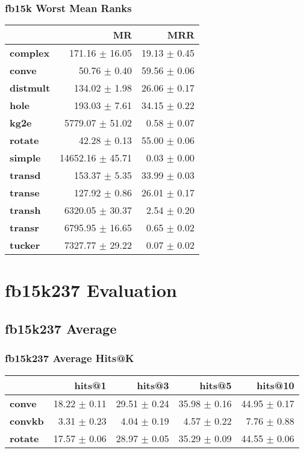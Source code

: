 \documentclass{article}
\begin{document}
\subsubsection{fb15k Worst Mean Ranks}
    \begin{center}
    \begin{tabular}{lrr}
\toprule
{} &                MR &           MRR \\
\midrule
\textbf{complex } &    171.16 $\pm$ 16.05 &  19.13 $\pm$ 0.45 \\
\textbf{conve   } &      50.76 $\pm$ 0.40 &  59.56 $\pm$ 0.06 \\
\textbf{distmult} &     134.02 $\pm$ 1.98 &  26.06 $\pm$ 0.17 \\
\textbf{hole    } &     193.03 $\pm$ 7.61 &  34.15 $\pm$ 0.22 \\
\textbf{kg2e    } &   5779.07 $\pm$ 51.02 &   0.58 $\pm$ 0.07 \\
\textbf{rotate  } &      42.28 $\pm$ 0.13 &  55.00 $\pm$ 0.06 \\
\textbf{simple  } &  14652.16 $\pm$ 45.71 &   0.03 $\pm$ 0.00 \\
\textbf{transd  } &     153.37 $\pm$ 5.35 &  33.99 $\pm$ 0.03 \\
\textbf{transe  } &     127.92 $\pm$ 0.86 &  26.01 $\pm$ 0.17 \\
\textbf{transh  } &   6320.05 $\pm$ 30.37 &   2.54 $\pm$ 0.20 \\
\textbf{transr  } &   6795.95 $\pm$ 16.65 &   0.65 $\pm$ 0.02 \\
\textbf{tucker  } &   7327.77 $\pm$ 29.22 &   0.07 $\pm$ 0.02 \\
\bottomrule
\end{tabular}

    \end{center}

\section{fb15k237 Evaluation}
\subsection{fb15k237 Average}
\subsubsection{fb15k237 Average Hits@K}
    \begin{center}
    \begin{tabular}{lrrrr}
\toprule
{} &        hits@1 &        hits@3 &        hits@5 &       hits@10 \\
\midrule
\textbf{conve } &  18.22 $\pm$ 0.11 &  29.51 $\pm$ 0.24 &  35.98 $\pm$ 0.16 &  44.95 $\pm$ 0.17 \\
\textbf{convkb} &   3.31 $\pm$ 0.23 &   4.04 $\pm$ 0.19 &   4.57 $\pm$ 0.22 &   7.76 $\pm$ 0.88 \\
\textbf{rotate} &  17.57 $\pm$ 0.06 &  28.97 $\pm$ 0.05 &  35.29 $\pm$ 0.09 &  44.55 $\pm$ 0.06 \\
\bottomrule
\end{tabular}

    \end{center}
\end{document}
